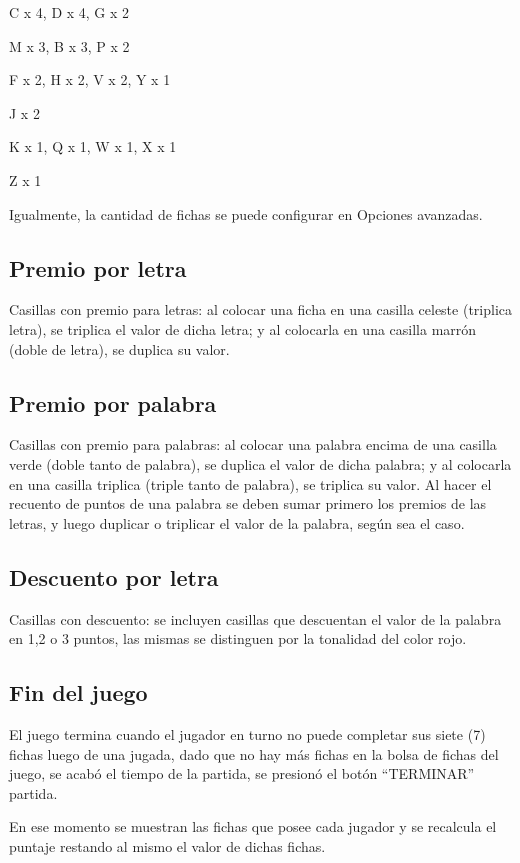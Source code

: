 \documentclass[12pt]{article}
\begin{document}
 C x 4, D x 4, G x 2
    
 M x 3, B x 3, P x 2
    
 F x 2, H x 2, V x 2, Y x 1
    
 J x 2
    
 K x 1, Q x 1, W x 1, X x 1
    
 Z x 1

Igualmente, la cantidad de fichas se puede configurar en Opciones avanzadas.

\subsection{Premio por letra}


Casillas con premio para letras: al colocar una ficha en una casilla celeste (triplica letra), se triplica   el valor de dicha letra; y al colocarla en una casilla marrón (doble de letra), se duplica su valor.
 
\subsection{Premio por palabra}
Casillas con premio para palabras: al colocar una palabra encima de una casilla verde (doble tanto de palabra), se duplica el valor de dicha palabra; y al colocarla en una casilla triplica (triple tanto de palabra), se triplica su valor. Al hacer el recuento de puntos de una palabra se deben sumar primero los premios de las letras, y luego duplicar o triplicar el valor de la palabra, según sea el caso.

\subsection{Descuento por letra}
Casillas con descuento: se incluyen casillas que descuentan el valor de la palabra en 1,2 o 3 puntos, las mismas se distinguen por la tonalidad del color rojo.

\subsection{Fin del juego}
El juego termina cuando el jugador en turno no puede completar sus siete (7) fichas luego de una jugada, dado que no hay más fichas en la bolsa de fichas del juego, se acabó el tiempo de la partida, se presionó el botón “TERMINAR” partida.

En ese momento se muestran las fichas que posee cada jugador y se recalcula el puntaje restando al mismo el valor de dichas fichas.
\end{document}
